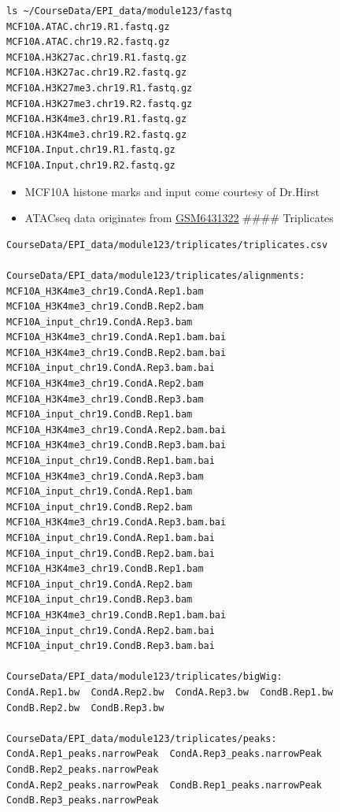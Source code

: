 \documentclass[
]{book}
\providecommand{\tightlist}{%
  \setlength{\itemsep}{0pt}\setlength{\parskip}{0pt}}
\begin{document}
\begin{verbatim}
ls ~/CourseData/EPI_data/module123/fastq
MCF10A.ATAC.chr19.R1.fastq.gz
MCF10A.ATAC.chr19.R2.fastq.gz
MCF10A.H3K27ac.chr19.R1.fastq.gz
MCF10A.H3K27ac.chr19.R2.fastq.gz
MCF10A.H3K27me3.chr19.R1.fastq.gz
MCF10A.H3K27me3.chr19.R2.fastq.gz
MCF10A.H3K4me3.chr19.R1.fastq.gz
MCF10A.H3K4me3.chr19.R2.fastq.gz
MCF10A.Input.chr19.R1.fastq.gz
MCF10A.Input.chr19.R2.fastq.gz
\end{verbatim}

\begin{itemize}
\tightlist
\item
  MCF10A histone marks and input come courtesy of Dr.Hirst
\item
  ATACseq data originates from \href{https://www.ncbi.nlm.nih.gov/geo/query/acc.cgi?acc=GSM6431322}{GSM6431322}
  \#\#\#\# Triplicates
\end{itemize}

\begin{verbatim}
CourseData/EPI_data/module123/triplicates/triplicates.csv

CourseData/EPI_data/module123/triplicates/alignments:
MCF10A_H3K4me3_chr19.CondA.Rep1.bam      MCF10A_H3K4me3_chr19.CondB.Rep2.bam      MCF10A_input_chr19.CondA.Rep3.bam
MCF10A_H3K4me3_chr19.CondA.Rep1.bam.bai  MCF10A_H3K4me3_chr19.CondB.Rep2.bam.bai  MCF10A_input_chr19.CondA.Rep3.bam.bai
MCF10A_H3K4me3_chr19.CondA.Rep2.bam      MCF10A_H3K4me3_chr19.CondB.Rep3.bam      MCF10A_input_chr19.CondB.Rep1.bam
MCF10A_H3K4me3_chr19.CondA.Rep2.bam.bai  MCF10A_H3K4me3_chr19.CondB.Rep3.bam.bai  MCF10A_input_chr19.CondB.Rep1.bam.bai
MCF10A_H3K4me3_chr19.CondA.Rep3.bam      MCF10A_input_chr19.CondA.Rep1.bam        MCF10A_input_chr19.CondB.Rep2.bam
MCF10A_H3K4me3_chr19.CondA.Rep3.bam.bai  MCF10A_input_chr19.CondA.Rep1.bam.bai    MCF10A_input_chr19.CondB.Rep2.bam.bai
MCF10A_H3K4me3_chr19.CondB.Rep1.bam      MCF10A_input_chr19.CondA.Rep2.bam        MCF10A_input_chr19.CondB.Rep3.bam
MCF10A_H3K4me3_chr19.CondB.Rep1.bam.bai  MCF10A_input_chr19.CondA.Rep2.bam.bai    MCF10A_input_chr19.CondB.Rep3.bam.bai

CourseData/EPI_data/module123/triplicates/bigWig:
CondA.Rep1.bw  CondA.Rep2.bw  CondA.Rep3.bw  CondB.Rep1.bw  CondB.Rep2.bw  CondB.Rep3.bw

CourseData/EPI_data/module123/triplicates/peaks:
CondA.Rep1_peaks.narrowPeak  CondA.Rep3_peaks.narrowPeak  CondB.Rep2_peaks.narrowPeak
CondA.Rep2_peaks.narrowPeak  CondB.Rep1_peaks.narrowPeak  CondB.Rep3_peaks.narrowPeak
\end{verbatim}
\end{document}
